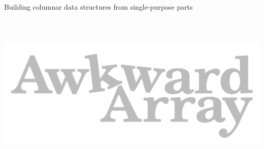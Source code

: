 \documentclass[aspectratio=169]{beamer}
\begin{document}
\begin{frame}{Building columnar data structures from single-purpose parts}
\vspace{-0.25 cm}
\begin{columns}
\end{columns}
\end{frame}

\begin{frame}{\mbox{ }}
\vspace{0.5 cm}
\begin{center}
\includegraphics[width=0.5\linewidth]{awkward-logo.pdf}
\end{center}
\end{frame}
\end{document}
